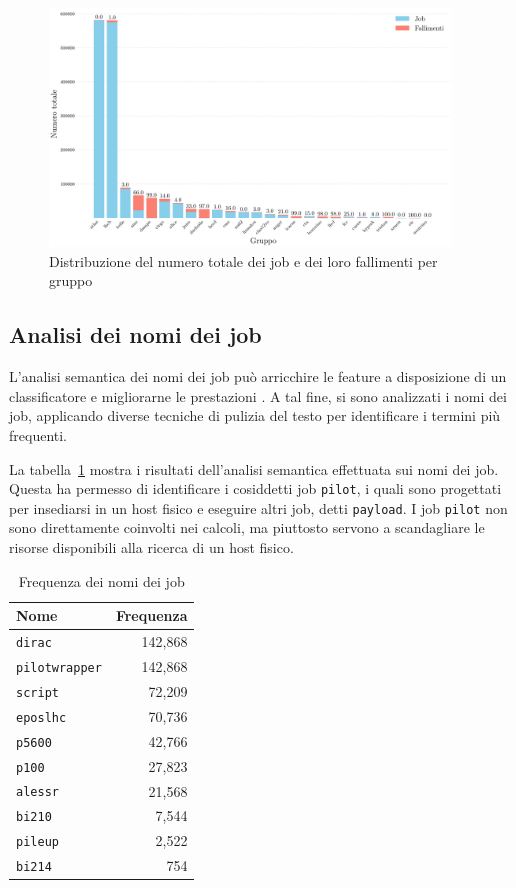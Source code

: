 \begin{figure}[!ht]
    \includegraphics[width=0.95\textwidth]{images/njobs_perqueue}
    \caption{Distribuzione del numero totale dei job e dei loro fallimenti per
    gruppo}
    \label{fig:njobs_perqueue}
\end{figure}

\subsection{Analisi dei nomi dei job}

L'analisi semantica dei nomi dei job può arricchire le feature a disposizione
di un classificatore e migliorarne le prestazioni \cite{Banjongkan2021}. A tal
fine, si sono analizzati i nomi dei job, applicando diverse tecniche di
pulizia del testo per identificare i termini più frequenti.

La tabella~\ref{table:job_names} mostra i risultati dell'analisi semantica
effettuata sui nomi dei job. Questa ha permesso di identificare i cosiddetti
job \texttt{pilot}, i quali sono progettati per insediarsi in un host fisico e
eseguire altri job, detti \texttt{payload}. I job \texttt{pilot} non sono
direttamente coinvolti nei calcoli, ma piuttosto servono a scandagliare le
risorse disponibili alla ricerca di un host fisico.

\begin{table}[!h]
    \centering
    \caption{Frequenza dei nomi dei job}
    \begin{tabular}{lr}
        \toprule
        \textbf{Nome} & \textbf{Frequenza} \\
        \midrule
        \texttt{dirac} & 142,868 \\
        \texttt{pilotwrapper} & 142,868 \\
        \texttt{script} & 72,209 \\
        \texttt{eposlhc} & 70,736 \\
        \texttt{p5600} & 42,766 \\
        \texttt{p100} & 27,823 \\
        \texttt{alessr} & 21,568 \\
        \texttt{bi210} & 7,544 \\
        \texttt{pileup} & 2,522 \\
        \texttt{bi214} & 754 \\
        \bottomrule
    \end{tabular}
    \label{table:job_names}
\end{table}

